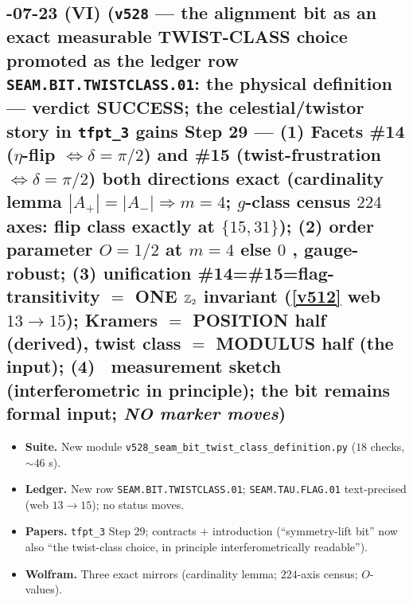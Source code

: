 \subsection*{-07-23 (VI) (\texttt{v528} --- the alignment bit as an exact measurable TWIST-CLASS choice promoted as the ledger row \texttt{SEAM.BIT.TWISTCLASS.01}: the physical definition --- verdict SUCCESS; the celestial/twistor story in \texttt{tfpt\_3} gains Step 29 --- (1) Facets \#14 ($\eta$-flip $\Leftrightarrow\delta=\pi/2$) and \#15 (twist-frustration $\Leftrightarrow\delta=\pi/2$) both directions exact \mE (cardinality lemma $|A_+|=|A_-|\Rightarrow m=4$; $g$-class census $224$ axes: flip class exactly at $\{15,31\}$); (2) order parameter $O=1/2$ at $m=4$ else $0$ \mE, gauge-robust; (3) unification \#14=\#15=flag-transitivity $=$ ONE $\mathbb{Z}_2$ invariant \mE (\vref{v512} web $13\to15$); Kramers $=$ POSITION half (derived), twist class $=$ MODULUS half (the input); (4) \mC\ measurement sketch (interferometric in principle); the bit remains formal input; \emph{NO marker moves})}
\begin{itemize}[leftmargin=1.5em]
\item \textbf{Suite.} New module \texttt{v528\_seam\_bit\_twist\_class\_definition.py} ($18$ checks, $\sim46$ s).
\item \textbf{Ledger.} New row \texttt{SEAM.BIT.TWISTCLASS.01}; \texttt{SEAM.TAU.FLAG.01} text-precised
(web $13\to15$); no status moves.
\item \textbf{Papers.} \texttt{tfpt\_3} Step 29; contracts $+$ introduction (``symmetry-lift bit'' now also
``the twist-class choice, in principle interferometrically readable'').
\item \textbf{Wolfram.} Three exact mirrors (cardinality lemma; $224$-axis census; $O$-values).
\end{itemize}

